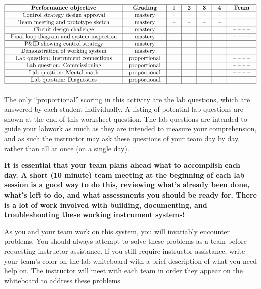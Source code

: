 \documentclass[12pt,a4paper]{article}
\begin{document}
$$\vbox{\offinterlineskip
\halign{\strut
\vrule \quad\hfil # \ \hfil & 
\vrule \quad\hfil # \ \hfil & 
\vrule \quad\hfil # \ \hfil & 
\vrule \quad\hfil # \ \hfil & 
\vrule \quad\hfil # \ \hfil & 
\vrule \quad\hfil # \ \hfil & 
\vrule \quad\hfil # \ \hfil \vrule \cr
\noalign{\hrule}
%
{\bf Performance objective} & {\bf Grading} & {\bf 1} & {\bf 2} & {\bf 3} & {\bf 4} & {\bf Team} \cr
%
\noalign{\hrule}
%
Control strategy design approval & mastery & -- & -- & -- & -- & \cr
%
\noalign{\hrule}
%
Team meeting and prototype sketch & mastery & -- & -- & -- & -- & \cr
%
\noalign{\hrule}
%
Circuit design challenge & mastery & & & & & -- -- -- -- \cr
%
\noalign{\hrule}
%
Final loop diagram and system inspection & mastery & & & & & -- -- -- -- \cr
%
\noalign{\hrule}
%
P\&ID showing control strategy & mastery & & & & & -- -- -- -- \cr
%
\noalign{\hrule}
%
Demonstration of working system & mastery & -- & -- & -- & -- & \cr
%
\noalign{\hrule}
%
Lab question: Instrument connections & proportional &  &  &  &  & -- -- -- -- \cr
%
\noalign{\hrule}
%
Lab question: Commissioning & proportional &  &  &  &  & -- -- -- -- \cr
%
\noalign{\hrule}
%
Lab question: Mental math & proportional &  &  &  &  & -- -- -- -- \cr
%
\noalign{\hrule}
%
Lab question: Diagnostics & proportional &  &  &  &  & -- -- -- -- \cr
%
\noalign{\hrule}
} %
}$$ %

The only ``proportional'' scoring in this activity are the lab questions, which are answered by each student individually.  A listing of potential lab questions are shown at the end of this worksheet question.  The lab questions are intended to guide your labwork as much as they are intended to measure your comprehension, and as such the instructor may ask these questions of your team day by day, rather than all at once (on a single day).

\vskip 10pt

{\bf It is essential that your team plans ahead what to accomplish each day.  A short (10 minute) team meeting at the beginning of each lab session is a good way to do this, reviewing what's already been done, what's left to do, and what assessments you should be ready for.  There is a lot of work involved with building, documenting, and troubleshooting these working instrument systems!}

As you and your team work on this system, you will invariably encounter problems.  You should always attempt to solve these problems as a team before requesting instructor assistance.  If you still require instructor assistance, write your team's color on the lab whiteboard with a brief description of what you need help on.  The instructor will meet with each team in order they appear on the whiteboard to address these problems.
\end{document}
